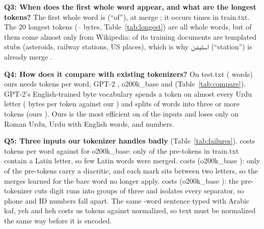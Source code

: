 \documentclass[10pt]{article}
\newcommand{\ur}[1]{\foreignlanguage{urdu}{#1}}
\newcommand{\tablefont}{\footnotesize}
\begin{document}
\begin{table}[!htb]\centering\tablefont

\caption{The first 50 merges by kind.}\label{tab:early}
\end{table}

\textbf{Q3: When does the first whole word appear, and what are the longest tokens?} The first whole word is
\QOneFirstWord{} (``of''), at merge \QOneFirstWordRank; it occurs \QOneFirstWordCount{} times in train.txt.
The 20 longest tokens (\QOneLongestMin--\QOneLongestMax{} bytes, Table~\ref{tab:longest}) are all whole words,
but \QOneLongestWiki{} of them come almost only from Wikipedia: \QOneStubShare{} of its \QOneWikiDocs{}
training documents are templated stubs (asteroids, railway stations, US places), which is why
\ur{اسٹیشن} (``station'') is already merge \QOneStationRank.

\begin{table}[!htb]\centering\tablefont

\caption{The 20 longest tokens.}\label{tab:longest}
\end{table}

\textbf{Q4: How does it compare with existing tokenizers?} On test.txt (\QTwoTestWords{} words) ours needs
\QTwoOurs{} tokens per word, GPT-2 \QTwoGpt, o200k\_base \QTwoOk{} and \QTwoHFName{} \QTwoHF{}
(Table~\ref{tab:compare}). GPT-2's English-trained byte vocabulary spends a token on almost every Urdu letter
(\QTwoGptBpt{} bytes per token against our \QTwoOursBpt) and splits \QTwoGptThree{} of words into three or
more tokens (ours \QTwoOursThree). Ours is the most efficient on \QTwoWins{} of the \QTwoInputs{} inputs and
loses only on Roman Urdu, Urdu with English words, and numbers.

\begin{table}[!htb]\centering\tablefont

\caption{Tokens per word (\texttt{str.split()} words; lower is better; best in bold).}\label{tab:compare}
\end{table}

\textbf{Q5: Three inputs our tokenizer handles badly} (Table~\ref{tab:failures}). \emph{\QThreeALabel} costs
\QThreeAOurs{} tokens per word against \QThreeAOk{} for o200k\_base: only \QThreeLatinShare{} of the
pre-tokens in train.txt contain a Latin letter, so few Latin words were merged. \emph{\QThreeBLabel} costs
\QThreeBOurs{} (o200k\_base \QThreeBOk): only \QThreeDiacriticShare{} of the pre-tokens carry a diacritic, and
each mark sits between two letters, so the merges learned for the bare word no longer apply.
\emph{\QThreeCLabel} costs \QThreeCOurs{} (o200k\_base \QThreeCOk): the pre-tokenizer cuts digit runs into
groups of three and isolates every separator, so phone and ID numbers fall apart. The same
\QThreeNormWords-word sentence typed with Arabic kaf, yeh and heh costs us \QThreeNormRaw{} tokens against
\QThreeNormNormalized{} normalized, so text must be normalized the same way before it is encoded.

\begin{table}[!htb]\centering\tablefont

\caption{The first words of each bad input as our tokens, separated by \textbar.}\label{tab:failures}
\end{table}
\end{document}
